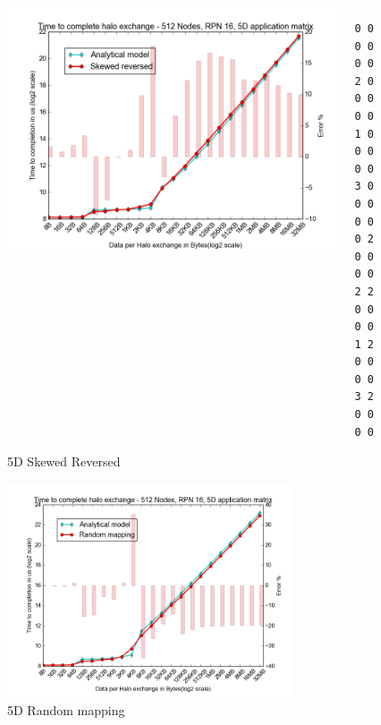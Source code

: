 \documentclass{beamer}
\begin{document}
\begin{frame}[fragile]
\begin{figure}
\caption{5D Skewed Reversed}
\begin{columns}
  \begin{column}{0.6\textwidth}
    \includegraphics[width=1\textwidth]{../mappings/5d_skewed_reversed.png}
  \end{column}
  \begin{column}{0.3\textwidth}
\lstset{title=Mapping sample}
\begin{lstlisting}[basicstyle=\footnotesize\ttfamily, frame=lines,columns=fixed]
0 0 0 0 0 0
2 0 0 0 0 0
1 0 0 0 0 0
3 0 0 0 0 0
0 2 0 0 0 0
2 2 0 0 0 0
1 2 0 0 0 0
3 2 0 0 0 0
\end{lstlisting}
  \end{column}
\end{columns}
\end{figure}
\end{frame}

\begin{frame}
\begin{figure}
\caption{5D Random mapping}
    \includegraphics[width=0.75\textwidth]{../mappings/5d_random_model.png}
\end{figure}
\end{frame}
\end{document}
